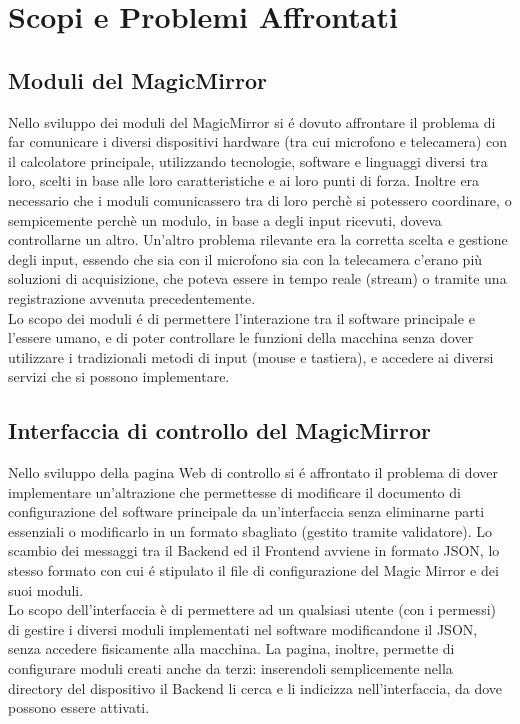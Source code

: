 \chapter{Scopi e Problemi Affrontati}

\section{Moduli del MagicMirror}
Nello sviluppo dei moduli del MagicMirror si \'e dovuto affrontare il problema di far comunicare
i diversi dispositivi hardware (tra cui microfono e telecamera) con il calcolatore principale, utilizzando tecnologie,
software e linguaggi diversi tra loro, scelti in base alle loro caratteristiche e ai loro punti di forza.
Inoltre era necessario che i moduli comunicassero tra di loro perchè si potessero coordinare, o sempicemente
perchè un modulo, in base a degli input ricevuti, doveva controllarne un altro.
Un'altro problema rilevante era la corretta scelta e gestione degli input, essendo che sia con il microfono sia
con la telecamera c'erano più soluzioni di acquisizione, che poteva essere in tempo reale (stream)
o tramite una registrazione avvenuta precedentemente.\\
Lo scopo dei moduli \'e di permettere l'interazione tra il software principale
e l'essere umano, e di poter controllare le funzioni della macchina senza dover utilizzare
i tradizionali metodi di input (mouse e tastiera), e accedere ai diversi servizi che si possono implementare.
\\[2\baselineskip]
\section{Interfaccia di controllo del MagicMirror}
Nello sviluppo della pagina Web di controllo si \'e affrontato il problema di dover
implementare un'altrazione che permettesse di modificare
il documento di configurazione del software principale da un'interfaccia senza eliminarne parti essenziali
o modificarlo in un formato sbagliato (gestito tramite validatore).
Lo scambio dei messaggi tra il Backend ed il Frontend avviene in formato JSON, lo stesso formato
con cui \'e stipulato il file di configurazione del Magic Mirror e dei suoi moduli.\\
Lo scopo dell'interfaccia è di permettere ad un qualsiasi utente (con i permessi) di gestire
i diversi moduli implementati nel software modificandone il JSON, senza accedere fisicamente alla macchina.
La pagina, inoltre, permette di configurare moduli creati anche da terzi: inserendoli
semplicemente nella directory del dispositivo il Backend li cerca e li indicizza nell'interfaccia,
da dove possono essere attivati.
